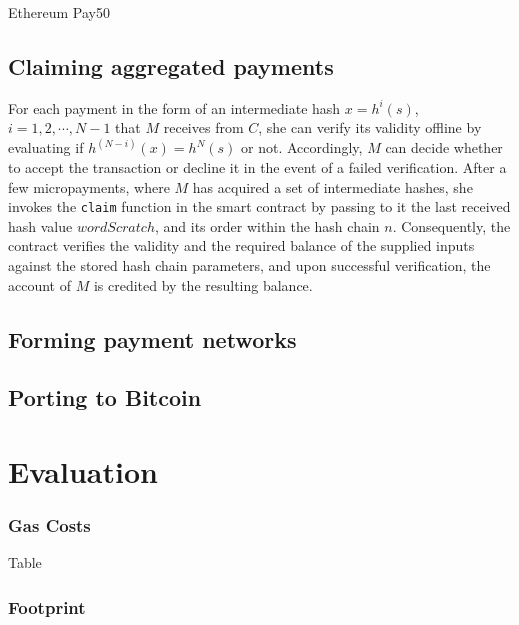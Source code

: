 Ethereum \textsf{Pay50} \cite{DF17}


\subsection{Claiming aggregated payments} 

For each payment in the form of an intermediate hash $x=h^i(s)$, $i=1,2,\cdots,N-1$ that $M$ receives from $C$, she can verify its validity offline by evaluating if $h^{(N-i)}(x) = h^N(s)$ or not. Accordingly, $M$ can decide whether to accept the transaction or decline it in the event of a failed verification. After a few micropayments, where $M$ has acquired a set of intermediate hashes, she invokes the \texttt{claim} function in the smart contract by passing to it the last received hash value $wordScratch$, and its order within the hash chain $n$. Consequently, the contract verifies the validity and the required balance of the supplied inputs against the stored hash chain parameters, and upon successful verification, the account of $M$ is credited by the resulting balance.

\subsection{Forming payment networks} 


\subsection{Porting to Bitcoin}





\section{Evaluation}

\subsubsection{Gas Costs}

Table

\subsubsection{Footprint}

